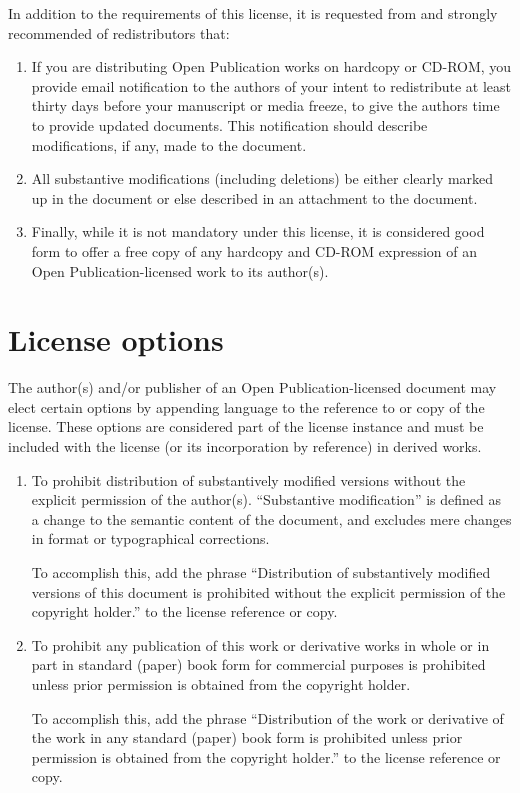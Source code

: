 In addition to the requirements of this license, it is requested from
and strongly recommended of redistributors that:

\begin{enumerate}
\item If you are distributing Open Publication works on hardcopy or
  CD-ROM, you provide email notification to the authors of your intent
  to redistribute at least thirty days before your manuscript or media
  freeze, to give the authors time to provide updated documents. This
  notification should describe modifications, if any, made to the
  document.
\item All substantive modifications (including deletions) be either
  clearly marked up in the document or else described in an attachment
  to the document.
\item Finally, while it is not mandatory under this license, it is
  considered good form to offer a free copy of any hardcopy and CD-ROM
  expression of an Open Publication-licensed work to its author(s).
\end{enumerate}

\section{License options}
\label{sec:opl:options}

The author(s) and/or publisher of an Open Publication-licensed
document may elect certain options by appending language to the
reference to or copy of the license. These options are considered part
of the license instance and must be included with the license (or its
incorporation by reference) in derived works.

\begin{enumerate}
\item To prohibit distribution of substantively modified versions
  without the explicit permission of the author(s). ``Substantive
  modification'' is defined as a change to the semantic content of the
  document, and excludes mere changes in format or typographical
  corrections.

  To accomplish this, add the phrase ``Distribution of substantively
  modified versions of this document is prohibited without the
  explicit permission of the copyright holder.'' to the license
  reference or copy.

\item To prohibit any publication of this work or derivative works in
  whole or in part in standard (paper) book form for commercial
  purposes is prohibited unless prior permission is obtained from the
  copyright holder.

  To accomplish this, add the phrase ``Distribution of the work or
  derivative of the work in any standard (paper) book form is
  prohibited unless prior permission is obtained from the copyright
  holder.'' to the license reference or copy.

\end{enumerate}


